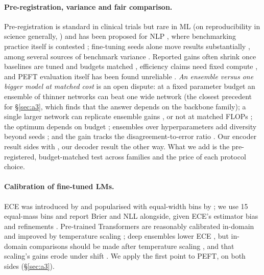 \documentclass[11pt]{article}
\begin{document}
\paragraph{Pre-registration, variance and fair comparison.} Pre-registration is standard in clinical trials but rare in ML (on reproducibility in science generally, \citealp{munafo2017manifesto,loken2017measurement}) and has been proposed for NLP \citep{vanmiltenburg2021preregistering}, where benchmarking practice itself is contested \citep{bowman2021will}; fine-tuning seeds alone move results substantially \citep{dodge2020finetuning}, among several sources of benchmark variance \citep{bouthillier2021accounting}. Reported gains often shrink once baselines are tuned and budgets matched \citep{lucic2018gans,musgrave2020metric,dacrema2019progress,dodge2019show,reimers2017reporting}, efficiency claims need fixed compute \citep{dehghani2022efficiency}, and PEFT evaluation itself has been found unreliable \citep{chen2022revisiting}. \emph{An ensemble versus one bigger model at matched cost} is an open dispute: at a fixed parameter budget an ensemble of thinner networks can beat one wide network \citep{chirkova2020deep} (the closest precedent for \S\ref{sec:a3}, which finds that the answer depends on the backbone family); a single larger network can replicate ensemble gains \citep{abe2022deep}, or not at matched FLOPs \citep{kondratyuk2020ensembling}; the optimum depends on budget \citep{lobacheva2020power}; ensembles over hyperparameters add diversity beyond seeds \citep{wenzel2020hyperparameter}; and the gain tracks the disagreement-to-error ratio \citep{theisen2023ensembles}. Our encoder result sides with \citeauthor{abe2022deep}, our decoder result the other way. What we add is the pre-registered, budget-matched test across families and the price of each protocol choice.

\paragraph{Calibration of fine-tuned LMs.} ECE was introduced by \citet{naeini2015} and popularised with equal-width bins by \citet{guo2017calibration}; we use 15 equal-mass bins and report Brier and NLL alongside, given ECE's estimator bias \citep{nixon2019} and refinements \citep{karandikar2021soft,minderer2021}. Pre-trained Transformers are reasonably calibrated in-domain and improved by temperature scaling \citep{desai2020calibration}; deep ensembles lower ECE \citep{lakshminarayanan2017simple}, but in-domain comparisons should be made after temperature scaling \citep{ashukha2020pitfalls}, and that scaling's gains erode under shift \citep{ovadia2019trust}. We apply the first point to PEFT, on both sides (\S\ref{sec:a3}).
\end{document}
